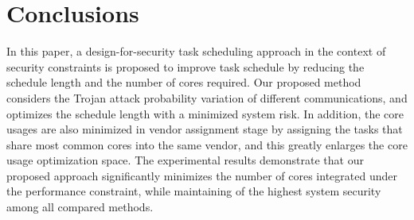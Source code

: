 \documentclass[10pt,journal]{IEEEtran}
\begin{document}



\section{Conclusions}

In this paper, a design-for-security task scheduling approach in the context of security constraints is proposed to improve task schedule by reducing the schedule length and the number of cores required. Our proposed method considers the Trojan attack probability variation of different communications, and optimizes the schedule length with a minimized system risk. In addition, the core usages are also minimized in vendor assignment stage by assigning the tasks that share most common cores into the same vendor, and this greatly enlarges the core usage optimization space. The experimental results demonstrate that our proposed approach significantly minimizes the number of cores integrated under the performance constraint, while maintaining of the highest system security among all compared methods.
\end{document}
